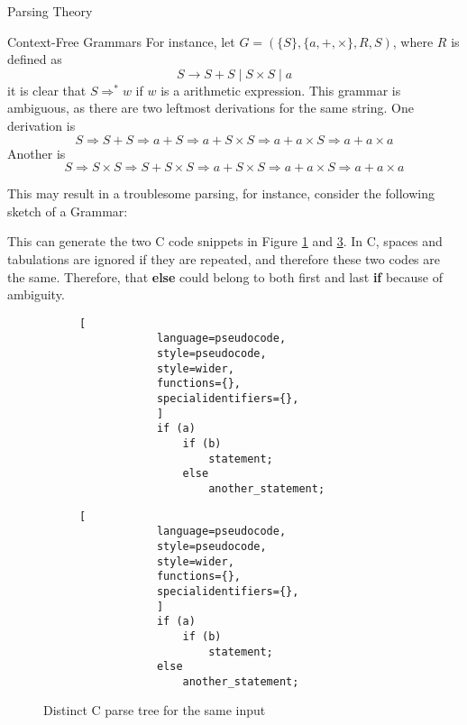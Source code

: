 \begin{section}{Parsing Theory}
\begin{subsection}{Context-Free Grammars}
For instance, let $G = (\{S\}, \{a, +, \times\}, R, S)$, where $R$ is defined
as
$$S \rightarrow S+S \; | \; S \times S \; | \; a $$
it is clear that $S \Rightarrow^* w$ if $w$ is a arithmetic expression. This
grammar is ambiguous, as there are two leftmost derivations for the same string.
One derivation is
$$ S \Rightarrow S + S \Rightarrow a + S \Rightarrow a + S \times S \Rightarrow a + a \times S \Rightarrow a + a \times a$$
Another is
$$ S \Rightarrow S \times S \Rightarrow S + S \times S \Rightarrow a + S \times S \Rightarrow a + a \times S \Rightarrow a + a \times a$$

This may result in a troublesome parsing, for instance, consider the
following sketch of a Grammar:



This can generate the two C code snippets in Figure \ref{fig:left_if} and
\ref{fig:right_if}. In C, spaces and tabulations are ignored if they are
repeated, and therefore these two codes are the same. Therefore, that
\textbf{else} could belong to both first and last \textbf{if} because of
ambiguity. 

\begin{figure}[ht]
    \centering
    \begin{subfigure}[b]{0.40\textwidth}

		\begin{lstlisting}[
			language=pseudocode,
			style=pseudocode,
			style=wider,
			functions={},
			specialidentifiers={},
			]
			if (a)
				if (b)
					statement;
				else
					another_statement;
		\end{lstlisting}
        \caption{\label{fig:left_if}}

    \end{subfigure}
    \begin{subfigure}[b]{0.40\textwidth}
		\begin{lstlisting}[
			language=pseudocode,
			style=pseudocode,
			style=wider,
			functions={},
			specialidentifiers={},
			]
			if (a)
				if (b)
					statement;
			else
				another_statement;
		\end{lstlisting}
        \caption{\label{fig:right_if}}
\end{subfigure}
\caption{Distinct C parse tree for the same input}
\end{figure}


\end{subsection}
\end{section}
